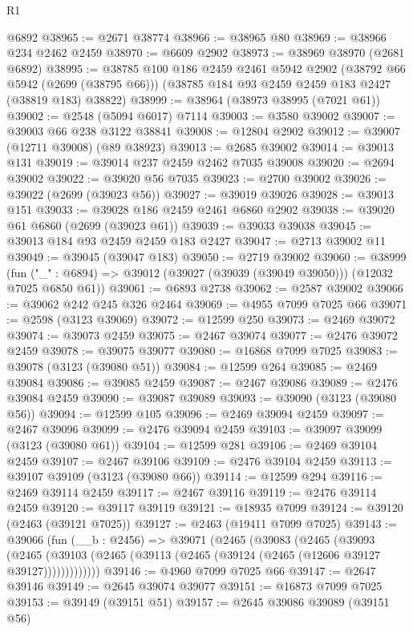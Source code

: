 \begin{lexlean}{R1}
\begin{coremodule}
    @6892
@38965 := @2671 @38774
@38966 := @38965 @80
@38969 := @38966 @234 @2462 @2459
@38970 := @6609 @2902
@38973 := @38969 @38970 (@2681 @6892)
@38995 := @38785
    @100
    @186
    @2459
    @2461
    @5942
    @2902
    (@38792 @66 @5942 (@2699 (@38795 @66)))
    (@38785 @184 @93 @2459 @2459 @183 @2427 (@38819 @183) @38822)
@38999 := @38964 (@38973 @38995 (@7021 @61))
@39002 := @2548 (@5094 @6017) @7114
@39003 := @3580 @39002
@39007 := @39003 @66 @238 @3122 @38841
@39008 := @12804 @2902
@39012 := @39007 (@12711 @39008) (@89 @38923)
@39013 := @2685 @39002
@39014 := @39013 @131
@39019 := @39014 @237 @2459 @2462 @7035 @39008
@39020 := @2694 @39002
@39022 := @39020 @56 @7035
@39023 := @2700 @39002
@39026 := @39022 (@2699 (@39023 @56))
@39027 := @39019 @39026
@39028 := @39013 @151
@39033 := @39028 @186 @2459 @2461 @6860 @2902
@39038 := @39020 @61 @6860 (@2699 (@39023 @61))
@39039 := @39033 @39038
@39045 := @39013 @184 @93 @2459 @2459 @183 @2427
@39047 := @2713 @39002 @11
@39049 := @39045 (@39047 @183)
@39050 := @2719 @39002
@39060 := @38999
    (fun ("_" : @6894) => @39012 (@39027 (@39039 (@39049 @39050))) (@12032 @7025 @6850 @61))
@39061 := @6893 @2738
@39062 := @2587 @39002
@39066 := @39062 @242 @245 @326 @2464
@39069 := @4955 @7099 @7025 @66
@39071 := @2598 (@3123 @39069)
@39072 := @12599 @250
@39073 := @2469 @39072
@39074 := @39073 @2459
@39075 := @2467 @39074
@39077 := @2476 @39072 @2459
@39078 := @39075 @39077
@39080 := @16868 @7099 @7025
@39083 := @39078 (@3123 (@39080 @51))
@39084 := @12599 @264
@39085 := @2469 @39084
@39086 := @39085 @2459
@39087 := @2467 @39086
@39089 := @2476 @39084 @2459
@39090 := @39087 @39089
@39093 := @39090 (@3123 (@39080 @56))
@39094 := @12599 @105
@39096 := @2469 @39094 @2459
@39097 := @2467 @39096
@39099 := @2476 @39094 @2459
@39103 := @39097 @39099 (@3123 (@39080 @61))
@39104 := @12599 @281
@39106 := @2469 @39104 @2459
@39107 := @2467 @39106
@39109 := @2476 @39104 @2459
@39113 := @39107 @39109 (@3123 (@39080 @66))
@39114 := @12599 @294
@39116 := @2469 @39114 @2459
@39117 := @2467 @39116
@39119 := @2476 @39114 @2459
@39120 := @39117 @39119
@39121 := @18935 @7099
@39124 := @39120 (@2463 (@39121 @7025))
@39127 := @2463 (@19411 @7099 @7025)
@39143 := @39066
    (fun (__b : @2456) =>
    @39071
      (@2465
        (@39083
          (@2465
            (@39093
              (@2465 (@39103 (@2465 (@39113 (@2465 (@39124 (@2465 (@12606 @39127 @39127)))))))))))))
@39146 := @4960 @7099 @7025 @66
@39147 := @2647 @39146
@39149 := @2645 @39074 @39077
@39151 := @16873 @7099 @7025
@39153 := @39149 (@39151 @51)
@39157 := @2645 @39086 @39089 (@39151 @56)

\end{coremodule}
\end{lexlean}
